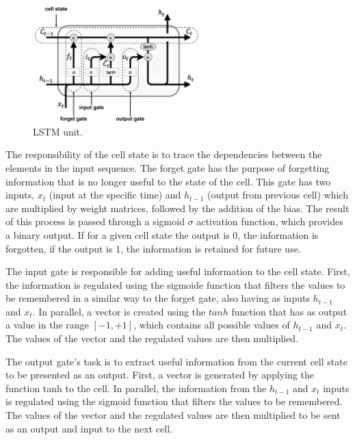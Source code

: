 \begin{figure}[h!]
    \centering
    \begin{center}
    \includegraphics[width=0.6\textwidth]{Images/LSTM_cell_detailed.png}
    \caption{LSTM unit.}
    \label{lstm}
    \end{center}
\end{figure}

The responsibility of the cell state is to trace the dependencies between the elements in the input sequence. The forget gate has the purpose of forgetting information that is no longer useful to the state of the cell. This gate has two inputs, $x_t$ (input at the specific time) and $h_{t-1}$ (output from previous cell) which are multiplied by weight matrices, followed by the addition of the bias. The result of this process is passed through a sigmoid $\sigma$ activation function, which provides a binary output. If for a given cell state the output is 0, the information is forgotten, if the output is 1, the information is retained for future use.

The input gate is responsible for adding useful information to the cell state. First, the information is regulated using the sigmoide function that filters the values to be remembered in a similar way to the forget gate, also having as inputs $h_{t-1}$ and $x_t$. In parallel, a vector is created using the $tanh$ function that has as output a value in the range $ [-1, +1]$, which contains all possible values of $h_{t-1}$ and $x_t$. The values of the vector and the regulated values are then multiplied. 

The output gate's task is to extract useful information from the current cell state to be presented as an output. First, a vector is generated by applying the function tanh to the cell. In parallel, the information from the $h_{t-1}$ and $x_t$ inputs is regulated using the sigmoid function that filters the values to be remembered. The values of the vector and the regulated values are then multiplied to be sent as an output and input to the next cell.


